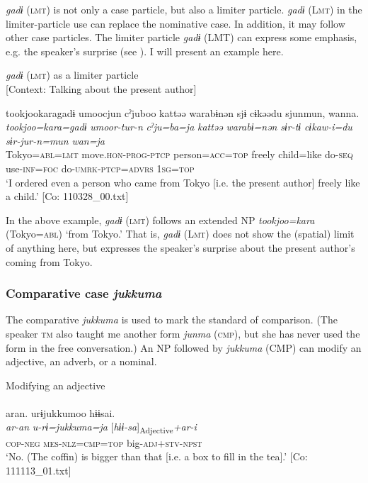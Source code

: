 \textit{gadɨ} (\textsc{lmt}) is not only a case particle, but also a limiter particle. \textit{gadɨ} (L\textsc{mt}) in the limiter-particle use can replace the nominative case. In addition, it may follow other case particles. The limiter particle \textit{gadɨ} (LMT) can express some emphasis, e.g. the speaker’s surprise (see ). I will present an example here.

\ea\label{ex:6-77}
  \textit{gadɨ} (\textsc{lmt}) as a limiter particle\\
  {}[Context: Talking about the present author]

{\TM}
\glll tookjookaragadɨ  umoocjun  cˀjuboo  kattəə   warabɨnən  sjɨ  cɨkəədu  sjunmun,  wanna.\\
\textit{tookjoo=kara=gadɨ}  \textit{umoor-tur-n}  \textit{cˀju=ba=ja}  \textit{kattəə} \textit{warabɨ=nən}  \textit{sɨr-tɨ}  \textit{cɨkaw-i=du}  \textit{sɨr-jur-n=mun}  \textit{wan=ja}\\
    Tokyo=\textsc{abl}=\textsc{lmt}  move.\textsc{hon}-\textsc{prog}-\textsc{ptcp}  person=\textsc{acc}=\textsc{top}  freely child=like  do-\textsc{seq}  use-\textsc{inf}=\textsc{foc}  do-\textsc{umrk}-\textsc{ptcp}=\textsc{advrs}  1\textsc{sg}=\textsc{top}\\
\glt    ‘I ordered even a person who came from Tokyo [i.e. the present author] freely like a child.’ [Co: 110328\_00.txt]
\z

In the above example, \textit{gadɨ} (\textsc{lmt}) follows an extended NP \textit{tookjoo=kara} (Tokyo=\textsc{abl}) ‘from Tokyo.’ That is, \textit{gadɨ} (L\textsc{mt}) does not show the (spatial) limit of anything here, but expresses the speaker’s surprise about the present author’s coming from Tokyo.

\subsubsection{Comparative case \textit{jukkuma}}

The comparative \textit{jukkuma} is used to mark the standard of comparison. (The speaker \textsc{tm} also taught me another form \textit{junma} (\textsc{cmp}), but she has never used the form in the free conversation.) An NP followed by \textit{jukkuma} (CMP) can modify an adjective, an adverb, or a nominal.

\ea\label{ex:6-78}
  Modifying an adjective\\
 \ea{}\\
{\TM}
\glll  aran.  urɨjukkumoo  hɨɨsai.\\
\textit{ar-an}  \textit{u-rɨ=jukkuma=ja}  [\textit{hɨɨ-sa}]\textsubscript{Adjective}\textit{+ar-i}\\
\textsc{cop}-\textsc{neg}  \textsc{mes}-\textsc{nlz}=\textsc{cmp}=\textsc{top}  big-\textsc{adj}+\textsc{stv}-\textsc{npst}\\
\glt ‘No. (The coffin) is bigger than that [i.e. a box to fill in the tea].’ [Co: 111113\_01.txt]
\z

